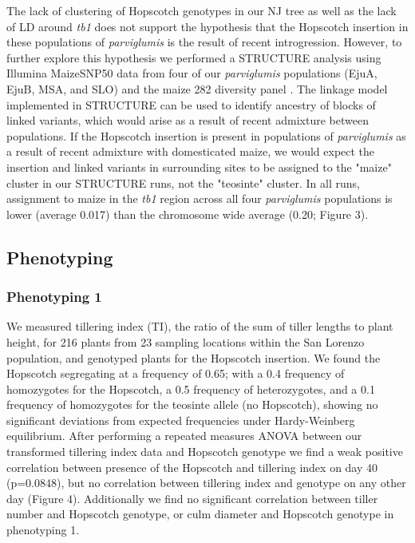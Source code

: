 \documentclass[12pt]{article}
\begin{document}
The lack of clustering of Hopscotch genotypes in our NJ tree as well as the lack of LD around \emph{tb1} does not support the hypothesis that the Hopscotch insertion in these populations of \emph{parviglumis} is the result of recent introgression. However, to further explore this hypothesis we performed a STRUCTURE analysis using Illumina MaizeSNP50 data from four of our \emph{parviglumis} populations (EjuA, EjuB, MSA, and SLO) and the maize 282 diversity panel \cite{Cook et al 2012, Phyhajarvi et al 2013}. The linkage model implemented in STRUCTURE can be used to identify ancestry of blocks of linked variants, which would arise as a result of recent admixture between populations. If the Hopscotch insertion is present in populations of \emph{parviglumis} as a result of recent admixture with domesticated maize, we would expect the insertion and linked variants in surrounding sites to be assigned to the "maize" cluster in our STRUCTURE runs, not the "teosinte" cluster. In all runs, assignment to maize in the \emph{tb1} region across all four \emph{parviglumis} populations is lower (average 0.017) than the chromosome wide average (0.20; Figure 3). 

\subsection*{Phenotyping}

\subsubsection*{Phenotyping 1}

We measured tillering index (TI), the ratio of the sum of tiller lengths to plant height, for 216 plants from 23 sampling locations within the San Lorenzo population, and genotyped plants for the Hopscotch insertion. We found the Hopscotch segregating at a frequency of 0.65; with a 0.4 frequency of homozygotes for the Hopscotch, a 0.5 frequency of heterozygotes, and a 0.1 frequency of homozygotes for the teosinte allele (no Hopscotch), showing no significant deviations from expected frequencies under Hardy-Weinberg equilibrium. After performing a repeated measures ANOVA between our transformed tillering index data and Hopscotch genotype we find a weak positive correlation between presence of the Hopscotch and tillering index on day 40 (p=0.0848), but no correlation between tillering index and genotype on any other day (Figure 4). Additionally we find no significant correlation between tiller number and Hopscotch genotype, or culm diameter and Hopscotch genotype in phenotyping 1.
\end{document}
